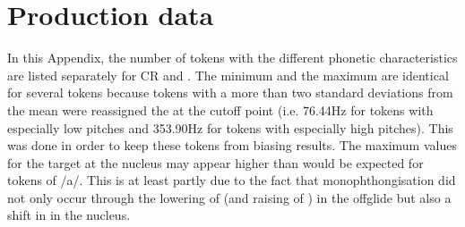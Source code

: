 \chapter{Production data}\label{appen:proddata}

In this Appendix, the number of tokens with the different phonetic characteristics are listed separately for CR and .  The minimum  and the maximum  are identical for several tokens because tokens with a  more than two standard deviations from the mean were reassigned the  at the cutoff point (i.e. 76.44Hz for tokens with especially low pitches and 353.90Hz for tokens with especially high pitches).  This was done in order to keep these tokens from biasing results.  The maximum values for the  target at the nucleus may appear higher than would be expected for tokens of /a/.  This is at least partly due to the fact that monophthongisation did not only occur through the lowering of  (and raising of ) in the offglide but also a shift in  in the nucleus.  

